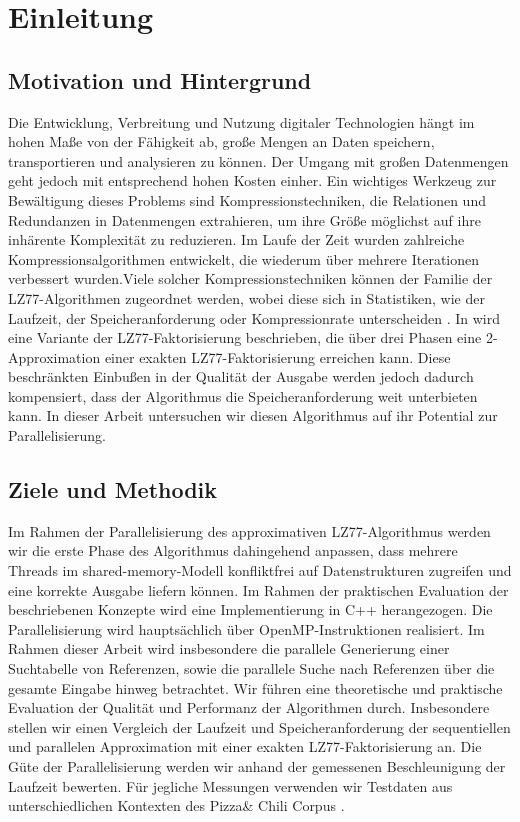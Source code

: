 \chapter{Einleitung}
\section{Motivation und Hintergrund}
Die Entwicklung, Verbreitung und Nutzung digitaler Technologien hängt im hohen Maße von der Fähigkeit ab, große Mengen an Daten speichern, transportieren und
analysieren zu können. Der Umgang mit großen Datenmengen geht jedoch mit entsprechend hohen Kosten einher. Ein wichtiges Werkzeug zur Bewältigung dieses Problems
sind Kompressionstechniken, die Relationen und Redundanzen in Datenmengen extrahieren, um ihre Größe möglichst auf ihre inhärente Komplexität zu reduzieren. 
Im Laufe der Zeit wurden zahlreiche Kompressionsalgorithmen entwickelt, die wiederum über mehrere Iterationen verbessert wurden.Viele solcher Kompressionstechniken
können der Familie der LZ77-Algorithmen \cite{LemZiv} zugeordnet werden, wobei diese sich in Statistiken, wie der Laufzeit, der Speicheranforderung oder Kompressionrate unterscheiden
. In \cite{ApproxLZ77} wird eine Variante der LZ77-Faktorisierung beschrieben, die über drei Phasen eine 2-Approximation einer exakten LZ77-Faktorisierung
 \cite{exactLemZiv} erreichen kann. Diese beschränkten Einbußen in der Qualität der Ausgabe werden jedoch dadurch kompensiert, dass der Algorithmus die Speicheranforderung
weit unterbieten kann. In dieser Arbeit untersuchen wir diesen Algorithmus auf ihr Potential zur Parallelisierung.

\section{Ziele und Methodik}
Im Rahmen der Parallelisierung des approximativen LZ77-Algorithmus werden wir die erste Phase des Algorithmus dahingehend anpassen, dass mehrere Threads im 
shared-memory-Modell konfliktfrei auf Datenstrukturen zugreifen und eine korrekte Ausgabe liefern können. Im Rahmen der praktischen Evaluation der
beschriebenen Konzepte wird eine Implementierung in C++ herangezogen. Die Parallelisierung wird hauptsächlich über OpenMP-Instruktionen \cite{openmp} realisiert.
Im Rahmen dieser Arbeit wird insbesondere die parallele Generierung einer Suchtabelle von Referenzen, sowie die parallele Suche nach Referenzen über die gesamte Eingabe
hinweg betrachtet. Wir führen eine theoretische und praktische Evaluation der Qualität und Performanz der Algorithmen durch. Insbesondere stellen wir einen Vergleich der
Laufzeit und Speicheranforderung der sequentiellen und parallelen Approximation mit einer exakten LZ77-Faktorisierung \cite{exactLemZiv} an. Die Güte der Parallelisierung
werden wir anhand der gemessenen Beschleunigung der Laufzeit bewerten. Für jegliche Messungen verwenden wir Testdaten aus unterschiedlichen Kontexten des 
Pizza\& Chili Corpus \cite{corpus}.